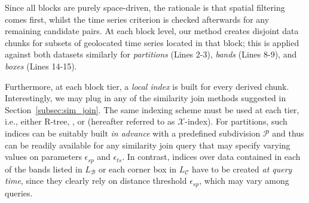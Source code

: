 Since all blocks are purely space-driven, the rationale is that spatial filtering comes first, whilst the time series criterion is checked afterwards for any remaining candidate pairs. At each block level, our method creates disjoint data chunks for subsets of geolocated time series located in that block; this is applied against both datasets similarly for {\em partitions} (Lines 2-3), {\em bands} (Lines 8-9), and {\em boxes} (Lines 14-15). 

Furthermore, at each block tier, a {\em local index} is built for every derived chunk. Interestingly, we may plug in any of the similarity join methods suggested in Section~\ref{subsec:sim_join}. The same indexing scheme must be used at each tier, i.e., either R-tree, \isax, or {\btsr}  (hereafter referred to as $\mathcal{X}$-index). For partitions, such indices can be suitably built {\em in advance} with a predefined subdivision $\mathcal{P}$ and thus can be readily available for any similarity join query that may specify varying values on parameters $\epsilon_{sp}$ and $\epsilon_{ts}$. In contrast, indices over data contained in each of the bands listed in $L_{\mathcal{B}}$ or each corner box in $L_{\mathcal{C}}$ have to be created {\em  at query time}, since they clearly rely on distance threshold $\epsilon_{sp}$, which may vary among queries.

\let\oldnl\nl
\newcommand{\nonl}{\renewcommand{\nl}{\let\nl\oldnl}}

